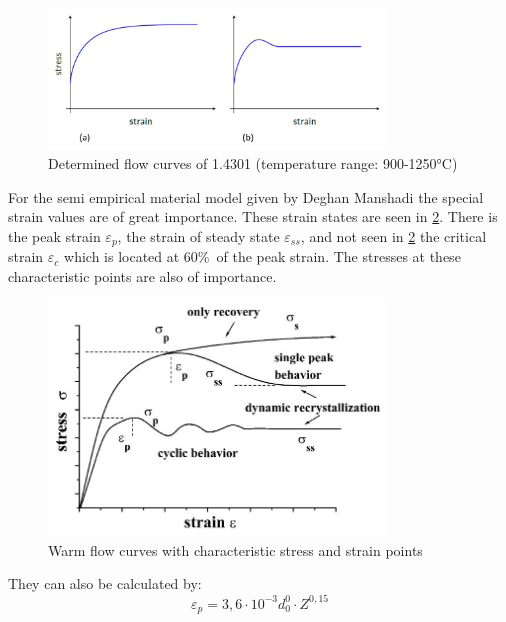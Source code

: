\begin{figure}[htbp]
 \centering
 \includegraphics[width=0.8\textwidth]{images/flowcurves}
 \caption{Determined flow curves of 1.4301 (temperature range: 900-1250°C)}
 \label{img:flowcurves}
\end{figure}

For the semi empirical material model given by Deghan Manshadi \cite{DEG08} the special strain values are of great importance. These strain states are seen in \ref{img:stressstrainpoints}. There is the peak strain $\varepsilon_{p}$, the strain of steady state $\varepsilon_{ss}$, and not seen in \ref{img:stressstrainpoints} the critical strain $\varepsilon_{c}$ which is located at 60\%\ of the peak strain. The stresses at these characteristic points are also of importance.

\begin{figure}[htbp]
 \centering
 \includegraphics[width=0.8\textwidth]{images/stressstrainpoints}
 \caption{Warm flow curves with characteristic stress and strain points \cite{ELW03}}
 \label{img:stressstrainpoints}
\end{figure}

They can also be calculated by:
\begin{equation}
 \varepsilon_{p} = 3,6\cdot10^{-3}d_{0}^{0}\cdot Z^{0,15}
\end{equation}

